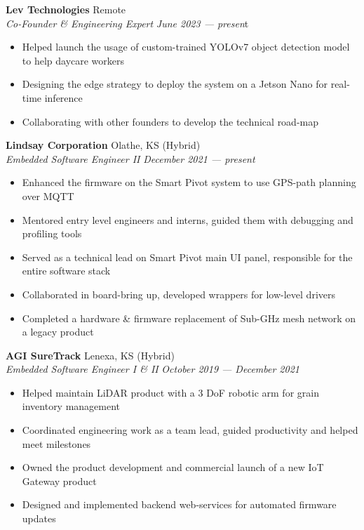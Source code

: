 \documentclass[a4paper]{article}
\begin{document}
\textbf{Lev Technologies} \hfill Remote\\
\textit{Co-Founder \& Engineering Expert} \hfill \textit{June 2023 --- presen}t\\
\vspace{-1mm}
\begin{itemize} \itemsep 1pt
    \item Helped launch the usage of custom-trained YOLOv7 object detection model to help daycare workers
    \item Designing the edge strategy to deploy the system on a Jetson Nano for real-time inference
    \item Collaborating with other founders to develop the technical road-map
\end{itemize}
\textbf{Lindsay Corporation} \hfill Olathe, KS (Hybrid)\\
\textit{Embedded Software Engineer II} \hfill \textit{December 2021 --- present}\\
\vspace{-1mm}
\begin{itemize} \itemsep 1pt
    \item Enhanced the firmware on the Smart Pivot system to use GPS-path planning over MQTT
    \item Mentored entry level engineers and interns, guided them with debugging and profiling tools
    \item Served as a technical lead on Smart Pivot main UI panel, responsible for the entire software stack
    \item Collaborated in board-bring up, developed wrappers for low-level drivers
    \item Completed a hardware \& firmware replacement of Sub-GHz mesh network on a legacy product
\end{itemize}
\textbf{AGI SureTrack} \hfill Lenexa, KS (Hybrid)\\
\textit{Embedded Software Engineer I \& II} \hfill \textit{October 2019 --- December 2021}\\
\vspace{-1mm}
\begin{itemize} \itemsep 1pt
	\item Helped maintain LiDAR product with a 3 DoF robotic arm for grain inventory management
	\item Coordinated engineering work as a team lead, guided productivity and helped meet milestones
	\item Owned the product development and commercial launch of a new IoT Gateway product
	\item Designed and implemented backend web-services for automated firmware updates
\end{itemize}
\end{document}
